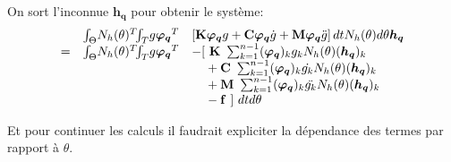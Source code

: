 \documentclass[12pt,a4paper]{report}
\begin{document}
On sort l'inconnue $\boldsymbol{h_q}$ pour obtenir le système:
\begin{equation}
\begin{array}{r r l}
	&\int_\Theta \!  N_h(\theta)^{T}  \!\! \int_T \! g \boldsymbol{\varphi_q}^T &
						\left[  \mathbf{K} \boldsymbol{\varphi_q}g
							+ \mathbf{C} \boldsymbol{\varphi_q} \dot{g}
							+ \mathbf{M} \boldsymbol{\varphi_q} \ddot{g}
						\right] dt  N_h(\theta) d\theta \boldsymbol{h_q}
	\\ = &\int_\Theta \!  N_h(\theta)^{T}  \!\! \int_T \! g \boldsymbol{\varphi_q}^T &
	  		-[~ \mathbf{K}~ \sum_{k=1}^{n-1} (\boldsymbol{\varphi_q})_k       g_k N_h(\theta) (\boldsymbol{h_q})_k 
	  \\&& \phantom{-[}
			+ \mathbf{C}~ \sum_{k=1}^{n-1} (\boldsymbol{\varphi_q})_k  \dot{g_k} N_h(\theta) (\boldsymbol{h_q})_k 
	  \\&& \phantom{-[}
			+ \mathbf{M}~ \sum_{k=1}^{n-1} (\boldsymbol{\varphi_q})_k \ddot{g_k} N_h(\theta) (\boldsymbol{h_q})_k
	  \\&& \phantom{-[}
			-\mathbf{f}~] ~dt d\theta 
\end{array}
\end{equation}

Et pour continuer les calculs il faudrait expliciter la dépendance des termes par rapport à $\theta$.
  
  
\end{document}

